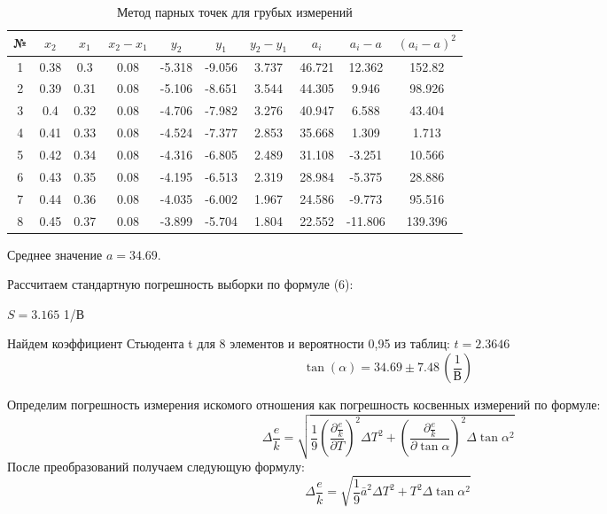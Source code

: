 \begin{center}
\begin{table}[h!]
\caption{Метод парных точек для грубых измерений}
\begin{tabular}{|c|c|c|c|c|c|c|c|c|c|}

\hline
№ & $x_2$ & $x_1$ & $x_2 - x_1$ & $y_2$ & $y_1$ & $y_2 - y_1$ & $a_i$ & $a_i - a$ & $(a_i - a)^2$ \\
\hline
1 & 0.38 & 0.3 & 0.08 & -5.318 & -9.056 & 3.737 & 46.721 & 12.362 & 152.82 \\ 
2 & 0.39 & 0.31 & 0.08 & -5.106 & -8.651 & 3.544 & 44.305 & 9.946 & 98.926 \\ 
3 & 0.4 & 0.32 & 0.08 & -4.706 & -7.982 & 3.276 & 40.947 & 6.588 & 43.404 \\ 
4 & 0.41 & 0.33 & 0.08 & -4.524 & -7.377 & 2.853 & 35.668 & 1.309 & 1.713 \\ 
5 & 0.42 & 0.34 & 0.08 & -4.316 & -6.805 & 2.489 & 31.108 & -3.251 & 10.566 \\ 
6 & 0.43 & 0.35 & 0.08 & -4.195 & -6.513 & 2.319 & 28.984 & -5.375 & 28.886 \\ 
7 & 0.44 & 0.36 & 0.08 & -4.035 & -6.002 & 1.967 & 24.586 & -9.773 & 95.516 \\ 
8 & 0.45 & 0.37 & 0.08 & -3.899 & -5.704 & 1.804 & 22.552 & -11.806 & 139.396 \\ 

\hline
\end{tabular}
\end{table}
\end{center}


\begin{center}
Среднее значение $a = 34.69$.
\end{center}


Рассчитаем стандартную погрешность выборки по формуле (6):
\begin{center}
$S=3.165$ 1/В
\end{center}

Найдем коэффициент Стьюдента t для 8 элементов и вероятности 0,95 из таблиц: $t = 2.3646$
\[
\tan(\alpha) = 34.69 \pm 7.48 \, \left(\frac{1}{\text{В}}\right)
\]

Определим погрешность измерения искомого отношения как погрешность косвенных измерений по формуле:
\begin{equation}
\Delta \frac{e}{k} = \sqrt{\frac{1}{9} \left( \frac{\partial \frac{e}{k}}{\partial T} \right)^2 \Delta T^2 + \left( \frac{\partial \frac{e}{k}}{\partial \tan \alpha} \right)^2 \Delta \tan \alpha^2 }
\end{equation}
После преобразований получаем следующую формулу:
\begin{equation}
\Delta \frac{e}{k} = \sqrt{\frac{1}{9} \bar{a}^2 \Delta T^2 + T^2 \Delta \tan \alpha^2}
\end{equation}

